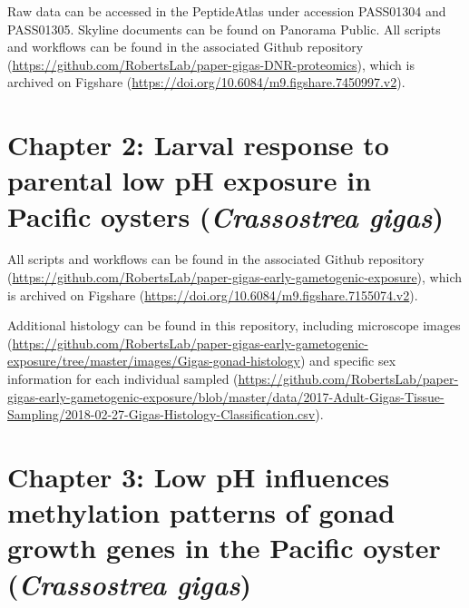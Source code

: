 \documentclass [11pt, proquest] {uwthesis}[2015/03/03]
\begin{document}
Raw data can be accessed in the PeptideAtlas under accession PASS01304 and PASS01305. Skyline documents can be found on Panorama Public. All scripts and workflows can be found in the associated Github repository (\url{https://github.com/RobertsLab/paper-gigas-DNR-proteomics}), which is archived on Figshare (\url{https://doi.org/10.6084/m9.figshare.7450997.v2}).

\hypertarget{chapter-2-larval-response-to-parental-low-ph-exposure-in-pacific-oysters-crassostrea-gigas}{%
\section{\texorpdfstring{Chapter 2: Larval response to parental low pH exposure in Pacific oysters (\emph{Crassostrea gigas})}{Chapter 2: Larval response to parental low pH exposure in Pacific oysters (Crassostrea gigas)}}\label{chapter-2-larval-response-to-parental-low-ph-exposure-in-pacific-oysters-crassostrea-gigas}}

All scripts and workflows can be found in the associated Github repository (\url{https://github.com/RobertsLab/paper-gigas-early-gametogenic-exposure}), which is archived on Figshare (\url{https://doi.org/10.6084/m9.figshare.7155074.v2}).

Additional histology can be found in this repository, including microscope images (\url{https://github.com/RobertsLab/paper-gigas-early-gametogenic-exposure/tree/master/images/Gigas-gonad-histology}) and specific sex information for each individual sampled (\url{https://github.com/RobertsLab/paper-gigas-early-gametogenic-exposure/blob/master/data/2017-Adult-Gigas-Tissue-Sampling/2018-02-27-Gigas-Histology-Classification.csv}).

\hypertarget{chapter-3-low-ph-influences-methylation-patterns-of-gonad-growth-genes-in-the-pacific-oyster-crassostrea-gigas}{%
\section{\texorpdfstring{Chapter 3: Low pH influences methylation patterns of gonad growth genes in the Pacific oyster (\emph{Crassostrea gigas})}{Chapter 3: Low pH influences methylation patterns of gonad growth genes in the Pacific oyster (Crassostrea gigas)}}\label{chapter-3-low-ph-influences-methylation-patterns-of-gonad-growth-genes-in-the-pacific-oyster-crassostrea-gigas}}
\end{document}
